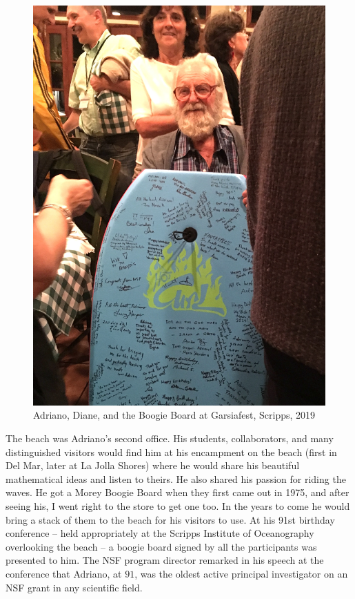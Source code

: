 \documentclass{notices}
\begin{document}
\begin{figure}
    \centering
    \includegraphics[width=0.95\linewidth]{Michelle_Wachs/IMG_4082.jpeg} 
 {\footnotesize Adriano, Diane, and the Boogie Board at Garsiafest, Scripps, 2019}
    \end{figure}
The beach was Adriano's second office. 
His students, collaborators, and many distinguished visitors would find him at his  encampment on the beach (first in Del Mar, later at La Jolla Shores) where he would share his beautiful mathematical ideas and listen to theirs. He also shared his passion for riding the waves.    He got a Morey Boogie Board when they first came out in 1975, and after seeing his, I went right to the store to get one too. In the years to come he would bring a stack of them to the beach for his visitors to use.  At his 91st birthday conference -- held appropriately at the Scripps Institute of Oceanography overlooking the beach -- a boogie board signed by all the participants was presented to him.  The NSF program director remarked in his speech at the conference that  Adriano, at $91$, was the oldest active principal investigator on an NSF grant in any scientific field. 
\end{document}

